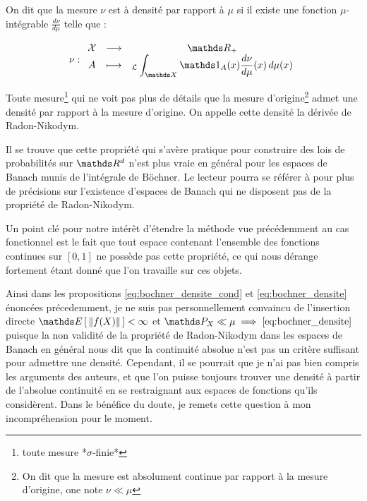 {{        \smallskip  

        \noindent On dit que la mesure $\nu$ est à densité par rapport à $\mu$ si il existe une fonction $\mu$-intégrable $\frac{d\nu}{d\mu}$ telle que :

        \begin{equation*}
            \nu : \func{\mathcal X}{\Rplus}{A}{ \leb_{\mathds X} \indicatrice{ A }(x)\frac{d\nu}{d\mu}(x) \, d\mu(x) }
        \end{equation*}

        
        Toute mesure\footnote{toute mesure *$\sigma$-finie*} qui ne voit pas plus de détails que la mesure d'origine\footnote{On dit que la mesure est absolument continue par rapport à la mesure d'origine, one note $\nu \ll \mu$} admet une densité par rapport à la mesure d'origine. On appelle cette densité la dérivée de Radon-Nikodym. 

        \noindent Il se trouve que cette propriété qui s'avère pratique pour construire des lois de probabilités sur $\R d$ n'est plus vraie en général pour les espaces de Banach munis de l'intégrale de Böchner. Le lecteur pourra se référer à \cite{Ryan2002} pour plus de précisions sur l'existence d'espaces de Banach qui ne disposent pas de la propriété de Radon-Nikodym.
        
        \bigskip

        \noindent Un point clé pour notre intérêt d'étendre la méthode vue précédemment au cas fonctionnel est le fait que tout espace contenant l'ensemble des fonctions continues sur $[0,1]$ ne possède pas cette propriété, ce qui nous dérange fortement étant donné que l'on travaille sur ces objets.\cite{Ryan2002} 
        

        Ainsi dans les propositions \eqref{eq:bochner_densite_cond} et \eqref{eq:bochner_densite} énoncées précedemment, je ne suis pas personnellement convaincu de l'insertion directe $\esperance{\lVert f(X) \rVert} < \infty$ et $\mathds P_X \ll \mu \implies \eqref{eq:bochner_densite}$ puisque la non validité de la propriété de Radon-Nikodym dans les espaces de Banach en général nous dit que la continuité absolue n'est pas un critère suffisant pour admettre une densité. Cependant, il se pourrait que je n'ai pas bien compris les arguments des auteurs, et que l'on puisse toujours trouver une densité à partir de l'absolue continuité en se restraignant aux espaces de fonctions qu'ils considèrent. Dans le bénéfice du doute, je remets cette question à mon incompréhension pour le moment.
        

}}
